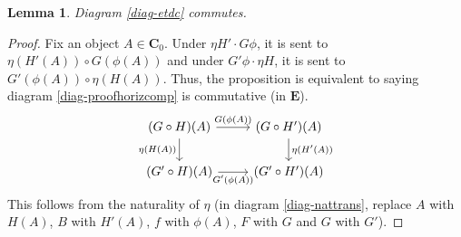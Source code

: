 \documentclass{article}
\newtheorem{lem}[thm]{Lemma}
\theoremstyle{definition}
\theoremstyle{remark}
\begin{document}
\begin{lem}
	Diagram \eqref{diag-etdc} commutes.
\end{lem}
\begin{proof}
Fix an object $A \in \mathbf{C}_0$. Under $\eta H' \cdot G\phi$, it is sent to $\eta(H'(A)) \circ G(\phi(A))$ and under $G'\phi \cdot \eta H$, it is sent to $G'(\phi(A)) \circ \eta(H(A))$. Thus, the proposition is equivalent to saying diagram \eqref{diag-proofhorizcomp} is commutative (in $\mathbf{E}$).
\begin{equation}\label{diag-proofhorizcomp}
\begin{tikzcd}
(G\circ H)(A) \arrow[r, "G(\phi(A))"] \arrow[d, "\eta(H(A))"'] & (G\circ H')(A) \arrow[d, "\eta(H'(A))"] \\
(G'\circ H)(A) \arrow[r, "G'(\phi(A))"']                       & (G'\circ H')(A)                        
\end{tikzcd}
\end{equation}
This follows from the naturality of $\eta$ (in diagram \eqref{diag-nattrans}, replace $A$ with $H(A)$, $B$ with $H'(A)$, $f$ with $\phi(A)$, $F$ with $G$ and $G$ with $G'$).
\end{proof}
\end{document}

